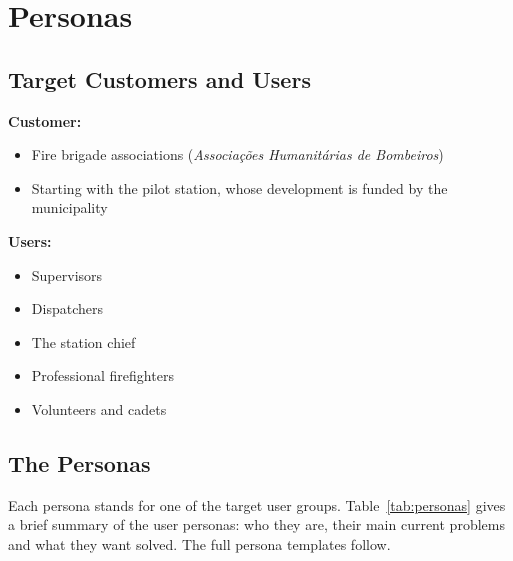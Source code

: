 \documentclass[11pt,a4paper]{article}
\let\oldsection\section
\renewcommand{\section}{\clearpage\oldsection}
\begin{document}
\section{Personas}

\subsection{Target Customers and Users}
\textbf{Customer:}
\begin{itemize}
  \item Fire brigade associations (\emph{Associações Humanitárias de Bombeiros})
  \item Starting with the pilot station, whose development is funded by the municipality
\end{itemize}

\textbf{Users:}
\begin{itemize}
  \item Supervisors
  \item Dispatchers
  \item The station chief
  \item Professional firefighters
  \item Volunteers and cadets
\end{itemize}

\clearpage  %
\subsection{The Personas}
Each persona stands for one of the target user groups. Table~\ref{tab:personas} gives a
brief summary of the user personas: who they are, their main current problems and what
they want solved. The full persona templates follow.
\end{document}
